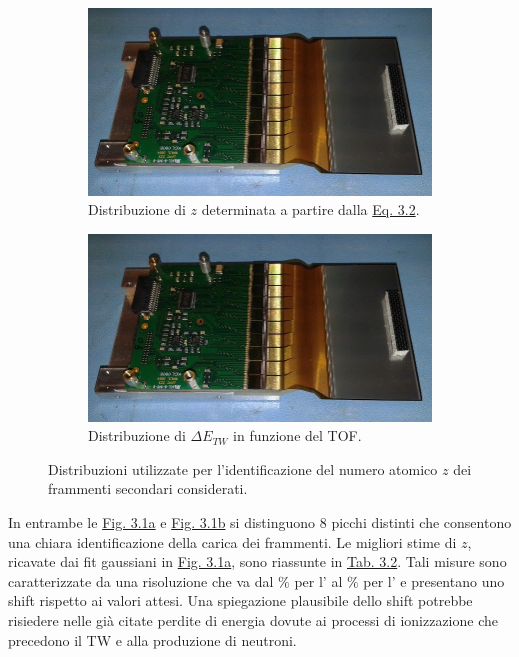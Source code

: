 \documentclass[12pt,a4paper,twoside]{report}
\begin{document}
	\begin{figure}[H]
		\centering
		\begin{subfigure}[t]{0.49\textwidth}
			\centering
			\includegraphics[width=\textwidth, scale=0.50]{msd.jpg}
			\caption{Distribuzione di $z$ determinata a partire dalla \hyperref[eq:atomic_number]{Eq. 3.2}.}
			\label{fig:atomic_numbersa}
		\end{subfigure}
		\hfill
		\begin{subfigure}[t]{0.49\textwidth}
			\centering
			\includegraphics[width=\textwidth, scale=0.50]{msd.jpg}
			\caption{Distribuzione di $\Delta E_{TW}$ in funzione del TOF.}
			\label{fig:atomic_numbersb}
		\end{subfigure}
		\caption{Distribuzioni utilizzate per l'identificazione del numero atomico $z$ dei frammenti secondari considerati.}
		\label{fig:atomic_numbers}
	\end{figure}
	In entrambe le \hyperref[fig:atomic_numbersa]{Fig. 3.1a} e \hyperref[fig:atomic_numbersb]{Fig. 3.1b} si distinguono $8$ picchi distinti che consentono una chiara identificazione della carica dei frammenti. Le migliori stime di $z$, ricavate dai fit gaussiani in \hyperref[fig:atomic_numbersa]{Fig. 3.1a}, sono riassunte in \hyperref[tab:atomic_numbers]{Tab. 3.2}. Tali misure sono caratterizzate da una risoluzione che va dal $\%$ per l' al $\%$ per l' e presentano uno shift rispetto ai valori attesi. Una spiegazione plausibile dello shift potrebbe risiedere nelle già citate perdite di energia dovute ai processi di ionizzazione che precedono il TW e alla produzione di neutroni.
\end{document}
